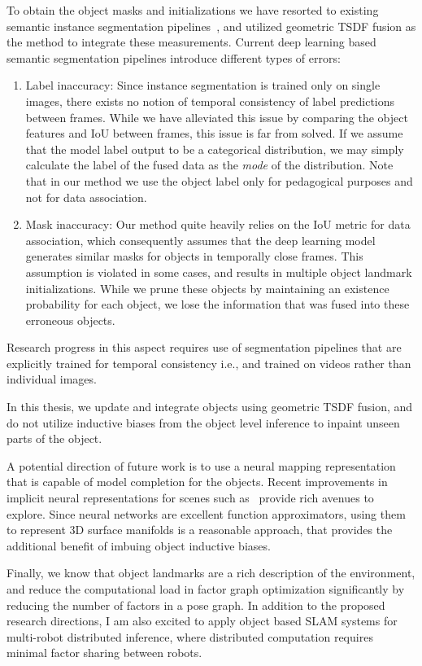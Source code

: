 To obtain the object masks and initializations we have resorted to existing semantic instance segmentation pipelines~\cite{kirillovPointRendImageSegmentation2020}, and utilized geometric TSDF fusion as the method to integrate these measurements. Current deep learning based semantic segmentation pipelines introduce different types of errors:
\begin{enumerate}
    \item Label inaccuracy: Since instance segmentation is trained only on single images, there exists no notion of temporal consistency of label predictions between frames. While we have alleviated this issue by comparing the object features and IoU between frames, this issue is far from solved. If we assume that the model label output to be a  categorical distribution, we may simply calculate the label of the fused data as the \emph{mode} of the distribution. Note that in our method we use the object label only for pedagogical purposes and not for data association.
    \item Mask inaccuracy: Our method quite heavily relies on the IoU metric for data association, which consequently assumes that the deep learning model generates similar masks for objects in temporally close frames. This assumption is violated in some cases, and results in multiple object landmark initializations. While we prune these objects by maintaining an existence probability for each object, we lose the information that was fused into these erroneous objects.
\end{enumerate}

Research progress in this aspect requires use of segmentation pipelines that are explicitly trained for temporal consistency i.e., and trained on videos rather than individual images.

In this thesis, we update and integrate objects using geometric TSDF fusion, and do not utilize inductive biases from the object level inference to inpaint unseen parts of the object.

A potential direction of future work is to use a neural mapping representation that is capable of model completion for the objects. Recent improvements in implicit neural representations for scenes such as~\cite{parkDeepSDFLearningContinuous2019, mildenhallNeRFRepresentingScenes2020} provide rich avenues to explore. Since neural networks are excellent function approximators, using them to represent 3D surface manifolds is a reasonable approach, that provides the additional benefit of imbuing object inductive biases.

Finally, we know that object landmarks are a rich description of the environment, and reduce the computational load in factor graph optimization significantly by reducing the number of factors in a pose graph. In addition to the proposed research directions, I am also excited to apply object based SLAM systems for multi-robot distributed inference, where distributed computation requires minimal factor sharing between robots.
